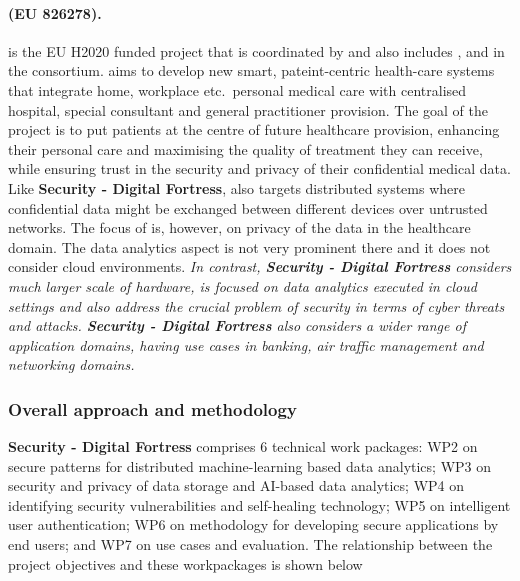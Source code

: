 \documentclass[a4paper,11pt]{article}
\newcommand{\project}[1]{\textbf{#1}\xspace}
\newcommand{\SECURITY}{\project{Security - Digital Fortress}}
\newcommand{\TheProject}{\SECURITY}
\begin{document}
\begin{mdframed}[backgroundcolor=blue!5]
\paragraph{\serums (EU 826278).} \serums is the EU H2020 funded project that is coordinated by \USTANshort{} and also includes \SOPRAshort{}, \IBMshort{} and \SCCHshort{} in the consortium. \serums aims to develop new smart, pateint-centric health-care systems that integrate home, workplace etc.~personal medical care with centralised hospital, special consultant and general practitioner provision. The goal of the \serums project is to put patients at the centre of future healthcare provision, enhancing their personal care and maximising the quality of treatment they can receive, while ensuring trust in the security and privacy of their confidential medical data. Like \TheProject{}, \serums also targets distributed systems where confidential data might be exchanged between different devices over untrusted networks. The focus of \serums is, however, on privacy of the data in the healthcare domain. The data analytics aspect is not very prominent there and it does not consider cloud environments. \emph{In contrast, \TheProject{} considers much larger scale of hardware, is focused on data analytics executed in cloud settings and also address the crucial problem of security in terms of cyber threats and attacks. \TheProject{} also considers a wider range of application domains, having use cases in banking, air traffic management and networking domains.}
\end{mdframed}

\subsubsection{Overall approach and methodology}


\TheProject{} comprises 6 technical work packages: WP2 on secure patterns for distributed machine-learning based data analytics; WP3 on security and privacy of data storage and AI-based data analytics; WP4 on identifying security vulnerabilities and self-healing technology; WP5 on intelligent user authentication; WP6 on methodology for developing secure applications by end users; and WP7 on use cases and evaluation. The relationship between the project objectives and these workpackages is shown below
\end{document}
